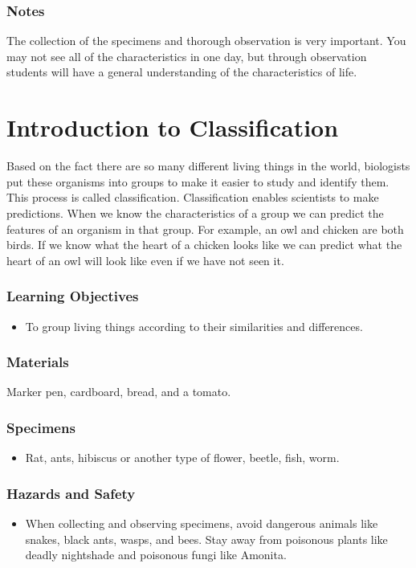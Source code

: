 \subsubsection*{Notes}
The collection of the specimens and thorough observation is very important. You may not see all of the characteristics in one day, but through observation students will have a general understanding of the characteristics of life.


\section{Introduction to Classification}
Based on the fact there are so many different living things in the world, biologists put these organisms into groups to make it easier to study and identify them. This process is called classification. Classification enables scientists to make predictions. When we know the characteristics of a group we can predict the features of an organism in that group. For example, an owl and chicken are both birds. If we know what the heart of a chicken looks like we can predict what the heart of an owl will look like even if we have not seen it.

\subsubsection*{Learning Objectives}
\begin{itemize}
\item{To group living things according to their similarities and differences.}
\end{itemize}

\subsubsection*{Materials}
Marker pen, cardboard, bread, and a tomato.

\subsubsection*{Specimens}
\begin{itemize}
\item{Rat, ants, hibiscus or another type of flower, beetle, fish, worm}.
\end{itemize}

\subsubsection*{Hazards and Safety}
\begin{itemize}
\item{When collecting and observing specimens, avoid dangerous animals like snakes, black ants, wasps, and bees. Stay away from poisonous plants like deadly nightshade and poisonous fungi like Amonita.}
\end{itemize}


